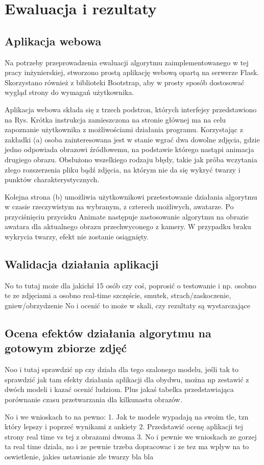 \chapter{Ewaluacja i rezultaty}
\label{cha:ewaluacjaIRezultaty}
\section{Aplikacja webowa}
Na potrzeby przeprowadzenia ewaluacji algorytmu zaimplementowanego w tej pracy inżynierskiej, stworzono prostą aplikację webową opartą na serwerze Flask. Skorzystano również z biblioteki Bootstrap, aby w prosty sposób dostosować wygląd strony do wymagań użytkownika.

Aplikacja webowa składa się z trzech podstron, których interfejsy przedstawiono na Rys. Krótka instrukcja zamieszczona na stronie głównej ma na celu zapoznanie użytkownika z możliwościami działania programu. Korzystając z zakładki (a) osoba zainteresowana jest w stanie wgrać dwa dowolne zdjęcia, gdzie jedno odpowiada obrazowi źródłowemu, na podstawie którego nastąpi animacja drugiego obrazu. Obsłużono wszelkiego rodzaju błędy, takie jak próba wczytania złego rozszerzenia pliku bądź zdjęcia, na którym nie da się wykryć twarzy i punktów charakterystycznych.

Kolejna strona (b) umożliwia użytkownikowi przetestowanie działania algorytmu w czasie rzeczywistym na wybranym, z czterech możliwych, awatarze. Po przyciśnięciu przycisku Animate następuje zastosowanie algorytmu na obrazie awatara dla aktualnego obrazu przechwyconego z kamery. W przypadku braku wykrycia twarzy, efekt nie zostanie osiągnięty.

\section{Walidacja działania aplikacji}
No to tutaj może dla jakichś 15 osób czy coś, poprosić o testowanie i np. osobno te ze zdjęciami a osobno real-time
szczęście,
smutek,
strach/zaskoczenie,
gniew/obrzydzenie
No i ocenić to może w skali, czy rezultaty są wystarczające
\section{Ocena efektów działania algorytmu na gotowym zbiorze zdjęć}
Noo i tutaj sprawdzić np czy działa dla tego szalonego modelu, jeśli tak to sprawdzić jak tam efekty działania aplikacji dla obydwu, można np zestawić z dwóch modeli i kazać ocenić ludziom. Plus jakaś tabelka przedstawiająca porównanie czasu przetwarzania dla kilkunastu obrazów.

No i we wnioskach to na pewno:
1. Jak te modele wypadają na swoim tle, tzn który lepszy i poprzeć wynikami z ankiety
2. Przedstawić ocenę aplikacji tej strony real time vs tej z obrazami dwoma
3. No i pewnie we wnioskach ze gorzej ta real time dziala, no i ze pewnie trzeba dopracowac i ze tez ma wplyw na to oswietlenie, jakies ustawianie zle twarzy bla bla
